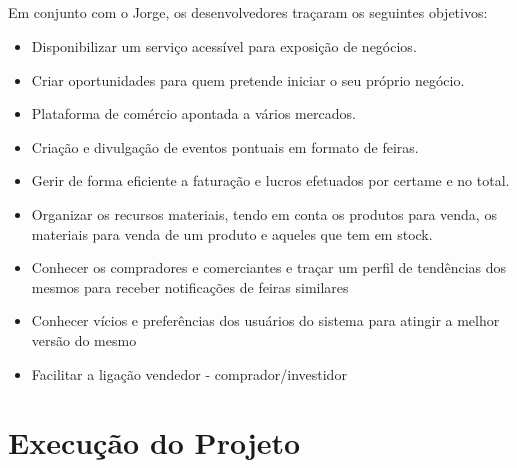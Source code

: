 \documentclass[a4paper,12pt]{scrreprt}
\begin{document}
    \paragraph{}
    Em conjunto com o Jorge, os desenvolvedores traçaram os seguintes objetivos:
    \begin{itemize}
        \item Disponibilizar um serviço acessível para exposição de negócios.
        \item Criar oportunidades para quem pretende iniciar o seu próprio negócio.
        \item Plataforma de comércio apontada a vários mercados.
        \item Criação e divulgação de eventos pontuais em formato de feiras.
        \item Gerir de forma eficiente a faturação e lucros efetuados por certame e no total.
        \item Organizar os recursos materiais, tendo em conta os produtos para venda, os materiais para venda de um produto e aqueles que tem em stock.
        \item Conhecer os compradores e comerciantes e traçar um perfil de tendências dos mesmos para receber notificações de feiras similares
        \item Conhecer vícios e preferências dos usuários do sistema para atingir a melhor versão do mesmo
        \item Facilitar a ligação vendedor - comprador/investidor

    \end{itemize}




\chapter{Execução do Projeto}
\end{document}
